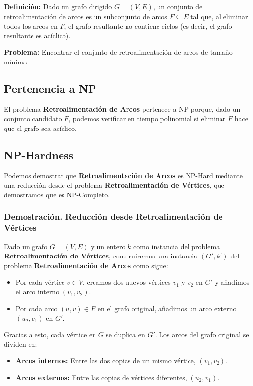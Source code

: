 \documentclass[a4paper,12pt]{article}
\begin{document}
\textbf{Definici\'on:} Dado un grafo dirigido $G = (V, E)$, un conjunto de retroalimentaci\'on de arcos es un subconjunto de arcos $F \subseteq E$ tal que, al eliminar todos los arcos en $F$, el grafo resultante no contiene ciclos (es decir, el grafo resultante es ac\'iclico).

\textbf{Problema:} Encontrar el conjunto de retroalimentaci\'on de arcos de tama\~no m\'inimo.

\subsection{Pertenencia a NP}
El problema \textbf{Retroalimentaci\'on de Arcos} pertenece a NP porque, dado un conjunto candidato $F$, podemos verificar en tiempo polinomial si eliminar $F$ hace que el grafo sea ac\'iclico. 
\subsection{NP-Hardness}
Podemos demostrar que \textbf{Retroalimentaci\'on de Arcos} es NP-Hard mediante una reducci\'on desde el problema \textbf{Retroalimentaci\'on de V\'ertices}, que demostramos que es NP-Completo.

\subsubsection{Demostraci\'on. Reducci\'on desde Retroalimentaci\'on de V\'ertices}
Dado un grafo $G = (V, E)$ y un entero $k$ como instancia del problema \textbf{Retroalimentaci\'on de V\'ertices}, construiremos una instancia $(G', k')$ del problema \textbf{Retroalimentaci\'on de Arcos} como sigue:
\begin{itemize}
    \item Por cada v\'ertice $v \in V$, creamos dos nuevos v\'ertices $v_1$ y $v_2$ en $G'$ y a\~nadimos el arco interno $(v_1, v_2)$.
    \item Por cada arco $(u, v) \in E$ en el grafo original, a\~nadimos un arco externo $(u_2, v_1)$ en $G'$.
\end{itemize}

Gracias a esto, cada v\'ertice en $G$ se duplica en $G'$. Los arcos del grafo original se dividen en:
\begin{itemize}
    \item \textbf{Arcos internos:} Entre las dos copias de un mismo v\'ertice, $(v_1, v_2)$.
    \item \textbf{Arcos externos:} Entre las copias de v\'ertices diferentes, $(u_2, v_1)$.
\end{itemize}
\end{document}

